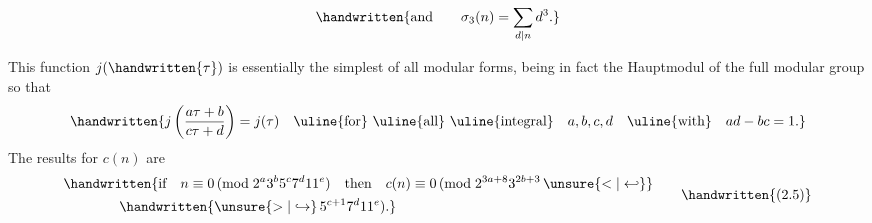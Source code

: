 
\[
\handwritten{\text{and}\qquad \sigma_{3}(n)=\sum_{d\mid n}d^{3}.}
\]

This function $j(\handwritten{\tau})$ is essentially the simplest of all modular forms, being in fact the Hauptmodul of the full modular group so that
\[
\handwritten{j\left(\frac{a\tau+b}{c\tau+d}\right)=j(\tau)\quad
\text{\uline{for} \uline{all} \uline{integral}}\quad a,b,c,d\quad
\text{\uline{with}}\quad ad-bc=1.}
\]
The results for $c(n)$ are
\[
\begin{aligned}
&\handwritten{\text{if}\quad n\equiv0\,(\mathrm{mod}\;2^{a}3^{b}5^{c}7^{d}11^{e})\quad
\text{then}\quad c(n)\equiv0\,(\mathrm{mod}\;2^{3a+8}3^{2b+3}\,\unsure{<|\hookleftarrow}}\\
&\hspace{4em}\handwritten{\unsure{>|\hookrightarrow}\,5^{c+1}7^{d}11^{e}).}
\end{aligned}
\tag*{\handwritten{(2.5)}}
\]

